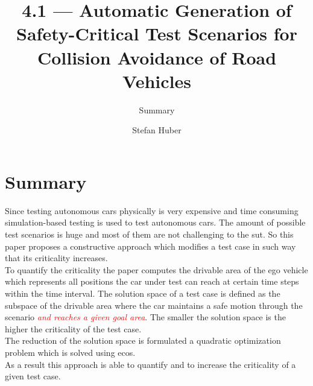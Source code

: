 \documentclass[oneside, notitlepage, twocolumn]{scrartcl}
\title{\LARGE 4.1 --- Automatic Generation of Safety-Critical Test Scenarios for Collision Avoidance of Road Vehicles}
\subtitle{Summary}
\author{Stefan Huber}
\newcommand{\draft}[1]{\textcolor{red}{\textit{#1}}}
\begin{document}
\maketitle

\section{Summary}
Since testing autonomous cars physically is very expensive and time consuming simulation-based testing is used to test autonomous cars.
The amount of possible test scenarios is huge and most of them are not challenging to the \gls{sut}.
So this paper proposes a constructive approach which modifies a test case in such way that its criticality increases.\\
To quantify the criticality the paper computes the drivable area of the ego vehicle which represents all positions the car under test can reach at certain time steps within the time interval.
The solution space of a test case is defined as the subspace of the drivable area where the car maintains a safe motion through the scenario \draft{and reaches a given goal area}.
The smaller the solution space is the higher the criticality of the test case.\\
The reduction of the solution space is formulated a quadratic optimization problem which is solved using \gls{ecos}.\\
As a result this approach is able to quantify and to increase the criticality of a given test case.
\end{document}
